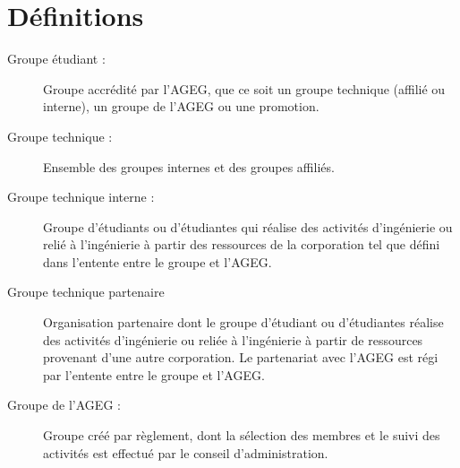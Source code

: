 \chapter*{Définitions}


\begin{description}

\item[Groupe étudiant :]{Groupe accrédité par l'AGEG, que ce soit un groupe technique (affilié ou interne), un groupe de l'AGEG ou une promotion.}

\item[Groupe technique :]{Ensemble des groupes internes et des groupes affiliés.}

\item[Groupe technique interne :]{Groupe d'étudiants ou d'étudiantes qui réalise des activités d'ingénierie ou relié à l'ingénierie à partir des ressources de la corporation tel que défini dans l'entente entre le groupe et l'AGEG.}

\item[Groupe technique partenaire]{Organisation  partenaire dont  le  groupe  d’étudiant ou d'étudiantes  réalise  des  activités  d’ingénierie  ou  reliée  à l’ingénierie  à  partir  de  ressources  provenant  d’une  autre  corporation. Le partenariat  avec  l’AGEG  est  régi  par  l’entente  entre  le  groupe  et l’AGEG.}

\item[Groupe de l’AGEG :]{Groupe créé par règlement, dont la sélection des membres et le suivi des activités est effectué par le conseil d'administration.}

\end{description}

\vspace{5mm}

